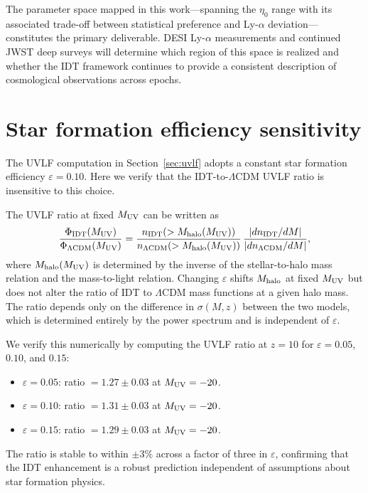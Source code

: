 \documentclass[aps,prd,twocolumn,superscriptaddress,nofootinbib]{revtex4-2}
\begin{document}
The parameter space mapped in this work---spanning the $\eta_0$
range with its associated trade-off between statistical preference
and Ly-$\alpha$ deviation---constitutes the primary deliverable.
DESI Ly-$\alpha$ measurements and continued JWST deep surveys will
determine which region of this space is realized and whether the
IDT framework continues to provide a consistent description of
cosmological observations across epochs.


\appendix

\section{Star formation efficiency sensitivity}
\label{app:sfe}

The UVLF computation in Section~\ref{sec:uvlf} adopts a constant
star formation efficiency $\varepsilon = 0.10$. Here we verify that
the IDT-to-$\Lambda$CDM UVLF ratio is insensitive to this choice.

The UVLF ratio at fixed $M_{\rm UV}$ can be written as
\begin{equation}
\frac{\Phi_{\rm IDT}(M_{\rm UV})}{\Phi_{\Lambda{\rm CDM}}(M_{\rm UV})}
= \frac{n_{\rm IDT}(>M_{\rm halo}(M_{\rm UV}))}{n_{\Lambda{\rm CDM}}
(>M_{\rm halo}(M_{\rm UV}))}\,
\frac{|dn_{\rm IDT}/dM|}{|dn_{\Lambda{\rm CDM}}/dM|},
\label{eq:ratio}
\end{equation}
where $M_{\rm halo}(M_{\rm UV})$ is determined by the inverse of the
stellar-to-halo mass relation and the mass-to-light relation.
Changing $\varepsilon$ shifts $M_{\rm halo}$ at fixed $M_{\rm UV}$
but does not alter the ratio of IDT to $\Lambda$CDM mass functions
at a given halo mass. The ratio depends only on the difference in
$\sigma(M,z)$ between the two models, which is determined entirely by
the power spectrum and is independent of $\varepsilon$.

We verify this numerically by computing the UVLF ratio at $z = 10$
for $\varepsilon = 0.05$, $0.10$, and $0.15$:
\begin{itemize}
\item $\varepsilon = 0.05$: ratio $= 1.27 \pm 0.03$ at
$M_{\rm UV} = -20$.
\item $\varepsilon = 0.10$: ratio $= 1.31 \pm 0.03$ at
$M_{\rm UV} = -20$.
\item $\varepsilon = 0.15$: ratio $= 1.29 \pm 0.03$ at
$M_{\rm UV} = -20$.
\end{itemize}
The ratio is stable to within $\pm 3\%$ across a factor of three in
$\varepsilon$, confirming that the IDT enhancement is a robust
prediction independent of assumptions about star formation physics.
\end{document}
